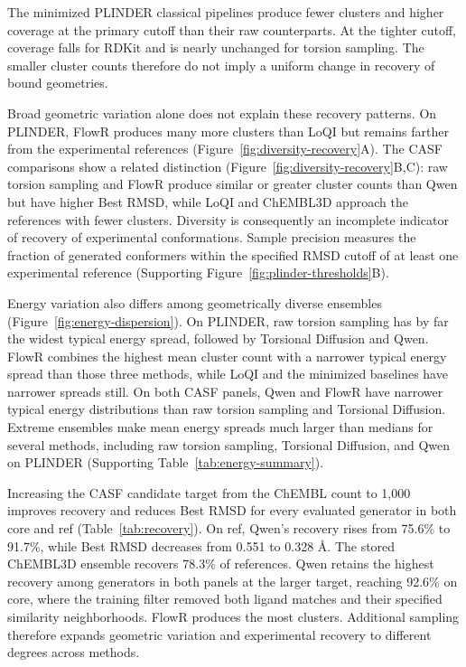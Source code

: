 The minimized PLINDER classical pipelines produce fewer clusters and higher coverage
at the primary cutoff than their raw counterparts. At the tighter cutoff, coverage
falls for RDKit and is nearly unchanged for torsion sampling. The smaller
cluster counts therefore do not imply a uniform change in recovery of bound geometries.

Broad geometric variation alone does not explain these recovery patterns. On PLINDER,
FlowR produces many more clusters than LoQI but remains farther from the experimental
references (Figure~\ref{fig:diversity-recovery}A). The CASF comparisons show a related
distinction (Figure~\ref{fig:diversity-recovery}B,C): raw torsion sampling and FlowR produce
similar or greater cluster counts than Qwen but have higher Best RMSD, while LoQI and
ChEMBL3D approach the references with fewer clusters. Diversity is consequently an
incomplete indicator of recovery of experimental conformations.
Sample precision measures the fraction of generated conformers within the specified
RMSD cutoff of at least one experimental reference (Supporting Figure~\ref{fig:plinder-thresholds}B).

\diversityfigure

Energy variation also differs among geometrically diverse ensembles (Figure~\ref{fig:energy-dispersion}).
On PLINDER, raw torsion sampling has by far the widest typical energy spread, followed
by Torsional Diffusion and Qwen. FlowR combines the highest mean cluster count with a
narrower typical energy spread than those three methods, while LoQI and the minimized
baselines have narrower spreads still. On both CASF panels, Qwen and FlowR have narrower
typical energy distributions than raw torsion sampling and Torsional Diffusion.
Extreme ensembles make mean energy spreads much larger than medians for several
methods, including raw torsion sampling, Torsional Diffusion, and Qwen on PLINDER
(Supporting Table~\ref{tab:energy-summary}).

\energyfigure

Increasing the CASF candidate target from the ChEMBL count to 1,000 improves recovery
and reduces Best RMSD for every evaluated generator in both core and ref
(Table~\ref{tab:recovery}). On ref, Qwen's recovery rises from 75.6\% to 91.7\%, while
Best RMSD decreases from 0.551 to 0.328 \AA{}. The stored ChEMBL3D ensemble recovers
78.3\% of references. Qwen retains the highest recovery among generators in both panels
at the larger target, reaching 92.6\% on core, where the training filter removed both
ligand matches and their specified similarity neighborhoods. FlowR produces the most
clusters. Additional sampling therefore expands geometric variation and experimental recovery to different degrees across methods.

